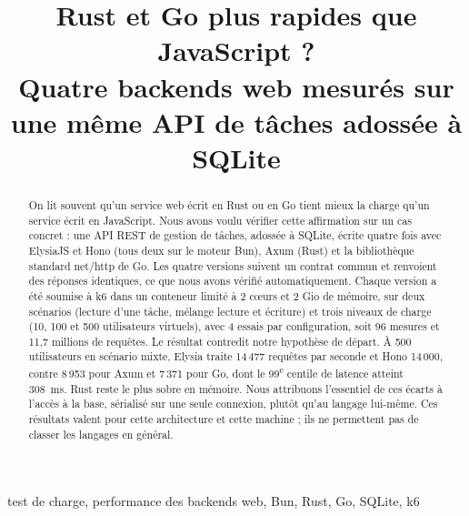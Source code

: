\documentclass[conference,a4paper]{IEEEtran}
\begin{document}
\title{Rust et Go plus rapides que JavaScript ?\\
Quatre backends web mesurés sur une même API de tâches adossée à SQLite}

\author{
\and
{}
\and
{}
\and
{}
}

\maketitle

\begin{abstract}
On lit souvent qu'un service web écrit en Rust ou en Go tient mieux la
charge qu'un service écrit en JavaScript. Nous avons voulu vérifier cette
affirmation sur un cas concret : une API REST de gestion de tâches,
adossée à SQLite, écrite quatre fois avec ElysiaJS et Hono (tous deux sur
le moteur Bun), Axum (Rust) et la bibliothèque standard net/http de Go.
Les quatre versions suivent un contrat commun et renvoient des réponses
identiques, ce que nous avons vérifié automatiquement. Chaque version a
été soumise à k6 dans un conteneur limité à 2 cœurs et 2 Gio de mémoire,
sur deux scénarios (lecture d'une tâche, mélange lecture et écriture) et
trois niveaux de charge (10, 100 et 500 utilisateurs virtuels), avec
4 essais par configuration, soit 96 mesures et 11,7 millions de requêtes.
Le résultat contredit notre hypothèse de départ. À 500 utilisateurs en
scénario mixte, Elysia traite 14\,477 requêtes par seconde et Hono
14\,000, contre 8\,953 pour Axum et 7\,371 pour Go, dont le 99\textsuperscript{e}
centile de latence atteint 308~ms. Rust reste le plus sobre en mémoire.
Nous attribuons l'essentiel de ces écarts à l'accès à la base, sérialisé
sur une seule connexion, plutôt qu'au langage lui-même. Ces résultats
valent pour cette architecture et cette machine ; ils ne permettent pas
de classer les langages en général.
\end{abstract}

\begin{IEEEkeywords}
test de charge, performance des backends web, Bun, Rust, Go, SQLite, k6
\end{IEEEkeywords}
\end{document}
